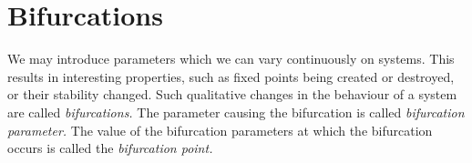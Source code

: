 \documentclass[oneside]{book}
\begin{document}
\chapter{Bifurcations}
We may introduce parameters which we can vary continuously on systems. This results in interesting properties, such as fixed points being created or destroyed, or their stability changed. Such qualitative changes in the behaviour of a system are called \textit{bifurcations.} The parameter causing the bifurcation is called \textit{bifurcation parameter.} The value of the bifurcation parameters at which the bifurcation occurs is called the \textit{bifurcation point.}
\\\\
\noindent{}
\end{document}

